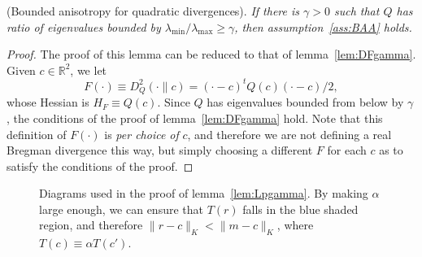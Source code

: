 \documentclass[11pt]{article}
\begin{document}
 (Bounded anisotropy for quadratic divergences).
\emph{
If there is $\gamma > 0$ such that $Q$ has ratio of eigenvalues bounded by $\lambda_{\text{min}}/\lambda_{\text{max}}\ge \gamma$,
	then assumption~\ref{ass:BAA} holds. 
}\begin{proof}
The proof of this lemma can be reduced to that of lemma~\ref{lem:DFgamma}.
Given $c\in\mathbb{R}^2$, we let \[ F(\cdot)\equiv D^2_Q(\cdot\parallel c)=(\cdot-c)^t Q(c) (\cdot-c)/2, \]
whose Hessian is $H_F\equiv Q(c)$. Since $Q$ has eigenvalues bounded from below by $\gamma$, 
	the conditions of the proof of lemma~\ref{lem:DFgamma} hold. 
Note that this definition of $F(\cdot)$ is \emph{per choice of} $c$, 
	and therefore we are not defining a real Bregman divergence this way, but simply choosing 
	a different $F$ for each $c$ as to satisfy the conditions of the proof. 

\end{proof}







\begin{figure}[htbp]
   \centering
	\quad\quad
   \caption{Diagrams used in the proof of lemma~\ref{lem:Lpgamma}. 
   	By making $\alpha$ large enough, we can ensure that $T(r)$ falls in the blue shaded region, and 
		therefore $\|r-c\|_K < \|m-c\|_K$, where $T(c)\equiv \alpha T(c')$. 
   }
\end{figure}
\end{document}
